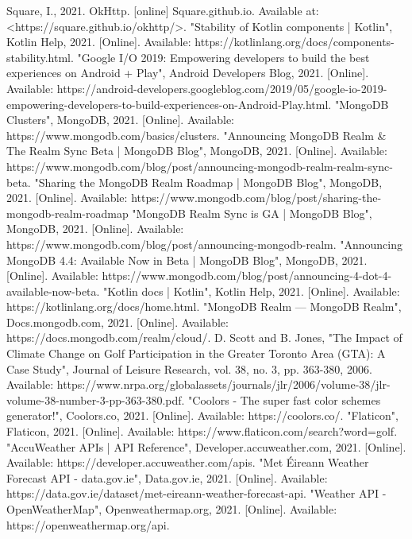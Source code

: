 \begin{thebibliography}{MT1}
 Square, I., 2021. OkHttp. [online] Square.github.io. Available at: <https://square.github.io/okhttp/>.
 "Stability of Kotlin components | Kotlin", Kotlin Help, 2021. [Online]. Available: https://kotlinlang.org/docs/components-stability.html.
 "Google I/O 2019: Empowering developers to build the best experiences on Android + Play", Android Developers Blog, 2021. [Online]. Available: https://android-developers.googleblog.com/2019/05/google-io-2019-empowering-developers-to-build-experiences-on-Android-Play.html.
 "MongoDB Clusters", MongoDB, 2021. [Online]. Available: https://www.mongodb.com/basics/clusters. 
 "Announcing MongoDB Realm \& The Realm Sync Beta | MongoDB Blog", MongoDB, 2021. [Online]. Available: https://www.mongodb.com/blog/post/announcing-mongodb-realm-realm-sync-beta.
 "Sharing the MongoDB Realm Roadmap | MongoDB Blog", MongoDB, 2021. [Online]. Available: https://www.mongodb.com/blog/post/sharing-the-mongodb-realm-roadmap
 "MongoDB Realm Sync is GA | MongoDB Blog", MongoDB, 2021. [Online]. Available: https://www.mongodb.com/blog/post/announcing-mongodb-realm.
"Announcing MongoDB 4.4: Available Now in Beta | MongoDB Blog", MongoDB, 2021. [Online]. Available: https://www.mongodb.com/blog/post/announcing-4-dot-4-available-now-beta.
"Kotlin docs | Kotlin", Kotlin Help, 2021. [Online]. Available: https://kotlinlang.org/docs/home.html.
"MongoDB Realm — MongoDB Realm", Docs.mongodb.com, 2021. [Online]. Available: https://docs.mongodb.com/realm/cloud/. 
D. Scott and B. Jones, "The Impact of Climate Change on Golf Participation in the Greater Toronto Area (GTA): A Case Study", Journal of Leisure Research, vol. 38, no. 3, pp. 363-380, 2006. Available: https://www.nrpa.org/globalassets/journals/jlr/2006/volume-38/jlr-volume-38-number-3-pp-363-380.pdf.
"Coolors - The super fast color schemes generator!", Coolors.co, 2021. [Online]. Available: https://coolors.co/. 
"Flaticon", Flaticon, 2021. [Online]. Available: https://www.flaticon.com/search?word=golf.
"AccuWeather APIs | API Reference", Developer.accuweather.com, 2021. [Online]. Available: https://developer.accuweather.com/apis.
"Met Éireann Weather Forecast API - data.gov.ie", Data.gov.ie, 2021. [Online]. Available: https://data.gov.ie/dataset/met-eireann-weather-forecast-api.
"Weather API - OpenWeatherMap", Openweathermap.org, 2021. [Online]. Available: https://openweathermap.org/api.

\end{thebibliography}
